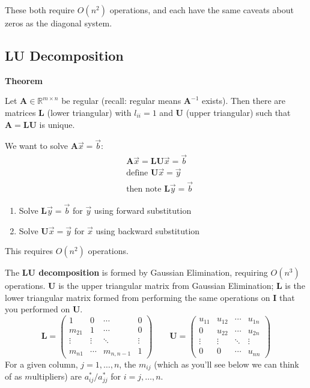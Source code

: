 \documentclass[12pt]{article}
\newcommand{\ve}[1]{\ensuremath{\mathbf{#1}}}
\begin{document}
These both require $O(n^2)$ operations, and each have the same caveats about zeros as the diagonal system.

\subsection*{LU Decomposition}

\textbf{Theorem}

Let $\ve{A} \in \mathbb{R}^{m \times n}$ be regular (recall: regular means $\ve{A}^{-1}$ exists). Then there are matrices $\ve{L}$ (lower triangular) with $l_{ii} = 1$ and $\ve{U}$ (upper triangular) such that $\ve{A} = \ve{L}\ve{U}$ is unique.

We want to solve $\ve{A}\vec{x} = \vec{b}$:
%
\begin{align}
&\ve{A}\vec{x} = \ve{L}\ve{U}\vec{x} = \vec{b} \nonumber \\
%
&\text{define } \ve{U}\vec{x} = \vec{y} \nonumber \\
%
&\text{then note }\ve{L}\vec{y} = \vec{b} \nonumber
\end{align}
%
\begin{enumerate}
\item Solve $\ve{L}\vec{y} = \vec{b}$ for $\vec{y}$ using forward substitution
\item Solve $\ve{U}\vec{x} = \vec{y}$ for $\vec{x}$ using backward substitution
\end{enumerate}
%
This requires $O(n^2)$ operations.

The \textbf{LU decomposition} is formed by Gaussian Elimination, requiring $O(n^3)$ operations. $\ve{U}$ is the upper triangular matrix from Gaussian Elimination; $\ve{L}$ is the lower triangular matrix formed from performing the same operations on $\ve{I}$ that you performed on $\ve{U}$. 
%
\begin{equation}
   \ve{L} = \begin{pmatrix}
      1      & 0      & \cdots    & 0 \\
      m_{21} & 1      & \cdots    & 0 \\
      \vdots & \vdots & \ddots    & \vdots \\     
      m_{n1} & \cdots & m_{n,n-1} & 1 
    \end{pmatrix} \qquad
  \ve{U} = \begin{pmatrix}
      u_{11} & u_{12} & \cdots & u_{1n} \\
      0      & u_{22} & \cdots & u_{2n} \\
      \vdots & \vdots & \ddots & \vdots \\     
      0      & 0      & \cdots &  u_{nn} 
    \end{pmatrix}
    \nonumber   
\end{equation} 
%
For a given column, $j = 1, \dots, n$, the $m_{ij}$ (which as you'll see below we can think of as $m$ultipliers) are $a^*_{ij} / a^*_{jj}$ for $i = j, \dots, n$. 
\end{document}
